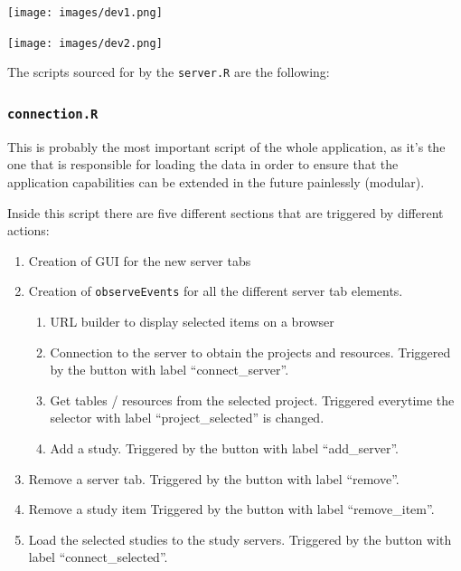 \documentclass[
]{book}
\providecommand{\tightlist}{%
  \setlength{\itemsep}{0pt}\setlength{\parskip}{0pt}}
\begin{document}
\texttt{[image: images/dev1.png]}

\texttt{[image: images/dev2.png]}

The scripts sourced for by the \texttt{server.R} are the following:

\hypertarget{connection}{%
\subsubsection{\texorpdfstring{\texttt{connection.R}}{connection.R}}\label{connection}}

This is probably the most important script of the whole application, as it's the one that is responsible for loading the data in order to ensure that the application capabilities can be extended in the future painlessly (modular).

Inside this script there are five different sections that are triggered by different actions:

\begin{enumerate}
\def\labelenumi{\arabic{enumi}.}
\tightlist
\item
  Creation of GUI for the new server tabs
\item
  Creation of \texttt{observeEvents} for all the different server tab elements.

  \begin{enumerate}
  \def\labelenumii{\arabic{enumii}.}
  \tightlist
  \item
    URL builder to display selected items on a browser
  \item
    Connection to the server to obtain the projects and resources. Triggered by the button with label ``connect\_server''.
  \item
    Get tables / resources from the selected project. Triggered everytime the selector with label ``project\_selected'' is changed.
  \item
    Add a study. Triggered by the button with label ``add\_server''.
  \end{enumerate}
\item
  Remove a server tab. Triggered by the button with label ``remove''.
\item
  Remove a study item Triggered by the button with label ``remove\_item''.
\item
  Load the selected studies to the study servers. Triggered by the button with label ``connect\_selected''.
\end{enumerate}
\end{document}
